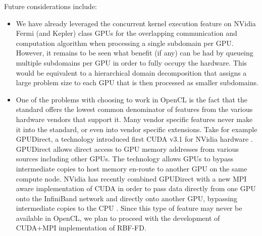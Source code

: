 Future considerations include: 
\begin{itemize} 
\item We have already leveraged the concurrent kernel execution feature on NVidia Fermi (and Kepler) class GPUs for the overlapping communication and computation algorithm when processing a single subdomain per GPU. However, it remains to be seen what benefit (if any) can be had by queueing multiple subdomains per GPU in order to fully occupy the hardware. This would be equivalent to a hierarchical domain decomposition that assigns a large problem size to each GPU that is then processed as smaller subdomains. 

\item One of the problems with choosing to work in OpenCL is the fact that the standard offers the lowest common denominator of features from the various hardware vendors that support it. Many vendor specific features never make it into the standard, or even into vendor specific extensions.
Take for example GPUDirect, a technology introduced first CUDA v3.1 for NVidia hardware \cite{CudaToolkitDoc}. GPUDirect allows direct access to GPU memory addresses from various sources including other GPUs. The technology allows GPUs to bypass intermediate copies to host memory en-route to another GPU on the same compute node. NVidia has recently combined GPUDirect with a new MPI aware implementation of CUDA in order to pass data directly from one GPU onto the InfiniBand network and directly onto another GPU, bypassing intermediate copies to the CPU \cite{NvidiaGPUMPI}. Since this type of feature may never be available in OpenCL, we plan to proceed with the development of CUDA+MPI implementation of RBF-FD.

\end{itemize}


%

